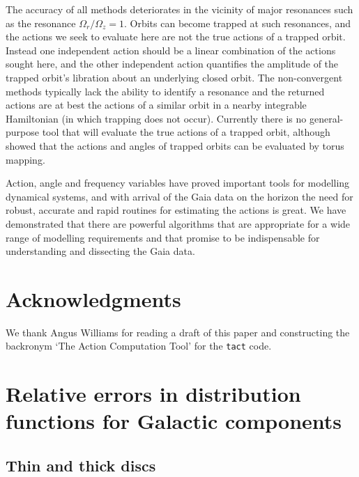 \documentclass[useAMS,usenatbib,fleqn,a4paper]{mn2e}
\begin{document}
The accuracy of all methods deteriorates in the vicinity of major resonances
such as the resonance $\Omega_r/\Omega_z=1$. Orbits can become trapped at
such resonances, and the actions we seek to evaluate here are not the true
actions of a trapped orbit. Instead one independent action should be a linear
combination of the actions sought here, and the other independent action
quantifies the amplitude of the trapped orbit's libration about an underlying
closed orbit.  The non-convergent methods typically lack the ability to
identify a resonance and the returned actions are at best the actions of a
similar orbit in a nearby integrable Hamiltonian (in which trapping does not
occur). Currently there is no general-purpose tool that will evaluate the
true actions of a trapped orbit, although \cite{KaasalainenB} showed that the
actions and angles of trapped orbits can be evaluated by torus mapping.

Action, angle and frequency variables have proved important tools for modelling dynamical systems, and with arrival of the Gaia data on the horizon the need for robust, accurate and rapid routines for estimating the actions is great. We have demonstrated that there are powerful algorithms that are appropriate for a wide range of modelling requirements and that promise to be indispensable for understanding and dissecting the Gaia data.

\section*{Acknowledgments}
We thank Angus Williams for reading a draft of this paper and constructing the backronym `The Action Computation Tool' for the \texttt{tact} code.




\appendix
\section{Relative errors in distribution functions for Galactic components}\label{Appendix}
\subsection{Thin and thick discs}
\end{document}
